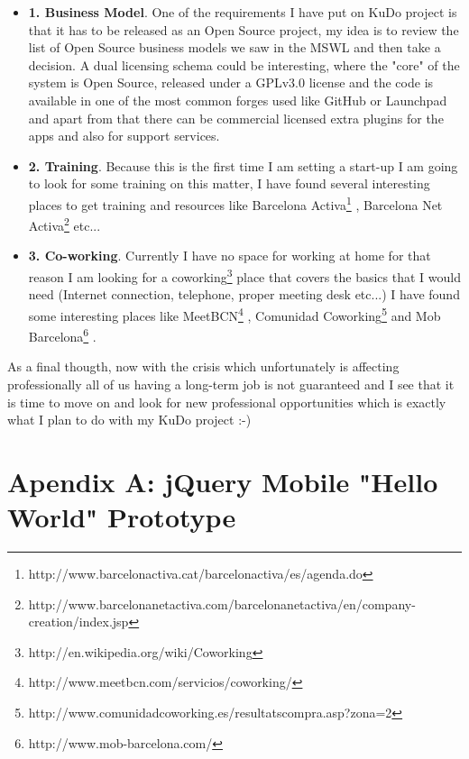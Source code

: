 \documentclass[a4paper,12pt]{book}
\begin{document}
\begin{itemize}
 \item \textbf{1. Business Model}. One of the requirements I have put on KuDo project is that it has to be  released as an Open Source project, my idea is to review the list of Open Source business models we saw in the MSWL and then take a decision. A dual licensing schema could be interesting, where the "core" of the system is Open Source, released under a GPLv3.0 license and the code is available in one of the most common forges used like GitHub or Launchpad and apart from that there can be commercial licensed extra plugins for the apps and also for support services.
 \item \textbf{2. Training}. Because this is the first time I am setting a start-up I am going to look for some training on this matter, I have found several interesting places to get training and resources like Barcelona Activa\footnote{http://www.barcelonactiva.cat/barcelonactiva/es/agenda.do} , Barcelona Net Activa\footnote{http://www.barcelonanetactiva.com/barcelonanetactiva/en/company-creation/index.jsp} etc...
 \item \textbf{3. Co-working}. Currently I have no space for working at home for that reason I am looking for a coworking\footnote{http://en.wikipedia.org/wiki/Coworking} place that covers the basics that I would need (Internet connection, telephone, proper meeting desk etc...) I have found some interesting places like MeetBCN\footnote{http://www.meetbcn.com/servicios/coworking/} , Comunidad Coworking\footnote{http://www.comunidadcoworking.es/resultatscompra.asp?zona=2}  and Mob Barcelona\footnote{http://www.mob-barcelona.com/} .
\end{itemize}

As a final thougth, now with the crisis which unfortunately is affecting professionally all of us having a long-term job is not guaranteed and I see that it is time to move on and look for new professional opportunities which is exactly what I plan to do with my KuDo project :-)


\chapter{Apendix A: jQuery Mobile "Hello World" Prototype}
\label{Apendix A: jQuery Mobile "Hello World" Prototype}

\end{document}
